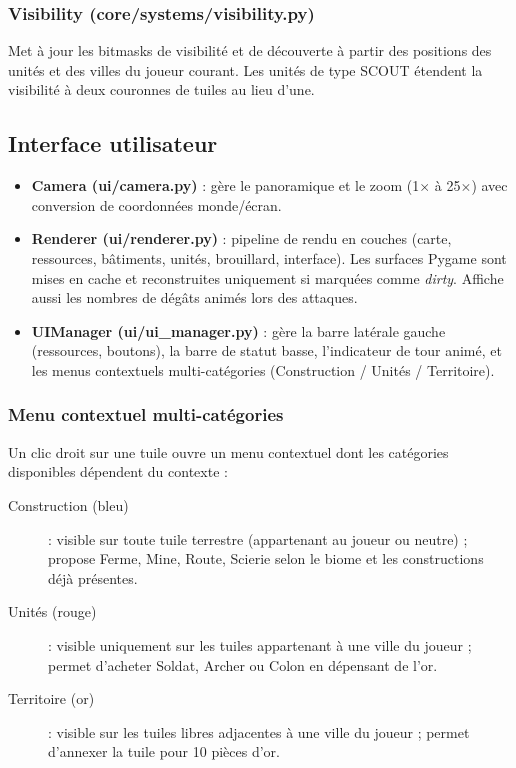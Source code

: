 \documentclass[12pt, a4paper]{article}
\begin{document}
\subsubsection{Visibility (core/systems/visibility.py)}
Met à jour les bitmasks de visibilité et de découverte à partir des positions des unités et
des villes du joueur courant. Les unités de type SCOUT étendent la visibilité à deux couronnes
de tuiles au lieu d'une.

\subsection{Interface utilisateur}

\begin{itemize}
    \item \textbf{Camera (ui/camera.py)} : gère le panoramique et le zoom (1$\times$ à 25$\times$) avec conversion de coordonnées monde/écran.
    \item \textbf{Renderer (ui/renderer.py)} : pipeline de rendu en couches (carte, ressources, bâtiments, unités, brouillard, interface). Les surfaces Pygame sont mises en cache et reconstruites uniquement si marquées comme \textit{dirty}. Affiche aussi les nombres de dégâts animés lors des attaques.
    \item \textbf{UIManager (ui/ui\_manager.py)} : gère la barre latérale gauche (ressources, boutons), la barre de statut basse, l'indicateur de tour animé, et les menus contextuels multi-catégories (Construction / Unités / Territoire).
\end{itemize}

\subsubsection{Menu contextuel multi-catégories}

Un clic droit sur une tuile ouvre un menu contextuel dont les catégories disponibles dépendent
du contexte :

\begin{description}
    \item[Construction (bleu)] : visible sur toute tuile terrestre (appartenant au joueur ou neutre) ;
    propose Ferme, Mine, Route, Scierie selon le biome et les constructions déjà présentes.
    \item[Unités (rouge)] : visible uniquement sur les tuiles appartenant à une ville du joueur ;
    permet d'acheter Soldat, Archer ou Colon en dépensant de l'or.
    \item[Territoire (or)] : visible sur les tuiles libres adjacentes à une ville du joueur ;
    permet d'annexer la tuile pour 10 pièces d'or.
\end{description}
\end{document}
